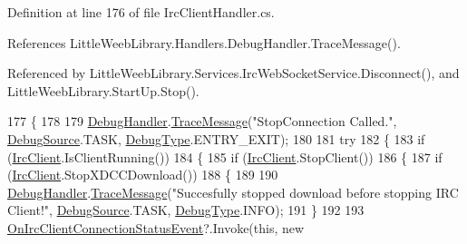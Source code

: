 Definition at line 176 of file Irc\+Client\+Handler.\+cs.



References Little\+Weeb\+Library.\+Handlers.\+Debug\+Handler.\+Trace\+Message().



Referenced by Little\+Weeb\+Library.\+Services.\+Irc\+Web\+Socket\+Service.\+Disconnect(), and Little\+Weeb\+Library.\+Start\+Up.\+Stop().


\begin{DoxyCode}
177         \{
178 
179             \mbox{\hyperlink{class_little_weeb_library_1_1_handlers_1_1_irc_client_handler_ab50ece494948d25db1839f4d6eab038f}{DebugHandler}}.\mbox{\hyperlink{interface_little_weeb_library_1_1_handlers_1_1_i_debug_handler_a2e405bc3492e683cd3702fae125221bc}{TraceMessage}}(\textcolor{stringliteral}{"StopConnection Called."}, 
      \mbox{\hyperlink{namespace_little_weeb_library_1_1_handlers_a2a6ca0775121c9c503d58aa254d292be}{DebugSource}}.TASK, \mbox{\hyperlink{namespace_little_weeb_library_1_1_handlers_ab66019ed40462876ec4e61bb3ccb0a62}{DebugType}}.ENTRY\_EXIT);
180 
181             \textcolor{keywordflow}{try}
182             \{
183                 \textcolor{keywordflow}{if} (\mbox{\hyperlink{class_little_weeb_library_1_1_handlers_1_1_irc_client_handler_a1c78638ea8025b27bb3e604f432ce325}{IrcClient}}.IsClientRunning())
184                 \{
185                     \textcolor{keywordflow}{if} (\mbox{\hyperlink{class_little_weeb_library_1_1_handlers_1_1_irc_client_handler_a1c78638ea8025b27bb3e604f432ce325}{IrcClient}}.StopClient())
186                     \{
187                         \textcolor{keywordflow}{if} (\mbox{\hyperlink{class_little_weeb_library_1_1_handlers_1_1_irc_client_handler_a1c78638ea8025b27bb3e604f432ce325}{IrcClient}}.StopXDCCDownload())
188                         \{
189 
190                             \mbox{\hyperlink{class_little_weeb_library_1_1_handlers_1_1_irc_client_handler_ab50ece494948d25db1839f4d6eab038f}{DebugHandler}}.\mbox{\hyperlink{interface_little_weeb_library_1_1_handlers_1_1_i_debug_handler_a2e405bc3492e683cd3702fae125221bc}{TraceMessage}}(\textcolor{stringliteral}{"Succesfully stopped download
       before stopping IRC Client!"}, \mbox{\hyperlink{namespace_little_weeb_library_1_1_handlers_a2a6ca0775121c9c503d58aa254d292be}{DebugSource}}.TASK, \mbox{\hyperlink{namespace_little_weeb_library_1_1_handlers_ab66019ed40462876ec4e61bb3ccb0a62}{DebugType}}.INFO);
191                         \}
192 
193                         \mbox{\hyperlink{class_little_weeb_library_1_1_handlers_1_1_irc_client_handler_aa8ef070963f103cc627e781c39b90c64}{OnIrcClientConnectionStatusEvent}}?.Invoke(\textcolor{keyword}{this}, \textcolor{keyword}{new} 

\end{DoxyCode}
